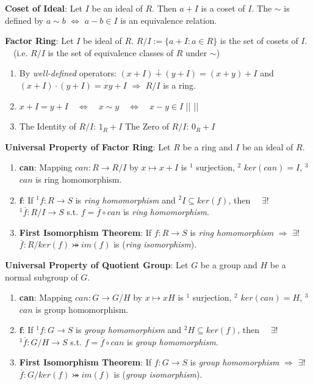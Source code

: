 \documentclass[9pt]{article}
\begin{document}
\textbf{Coset of Ideal}: Let $I$ be an ideal of $R$. Then $a+I$ is a coset of $I$. \quad The $\sim$ is defined by $a\sim b$ $\Leftrightarrow$ $a-b\in I$ is an equivalence relation.

\textbf{Factor Ring}: Let $I$ be ideal of $R$. $R/I:=\{a+I:a\in R\}$ is the set of cosets of $I$. \ \ {\small (i.e. $R/I$ is the set of equivalence classes of $R$ under $\sim$) }

\begin{enumerate}[itemsep=-2pt, topsep=-2pt]
    \item By \textit{well-defined} operators: $(x+I)\dotplus(y+I)=(x+y) + I$ and $(x+I)\cdot(y+I)=xy+I$ \quad $\Rightarrow$ \quad $R/I$ is a ring.
    \item $x+I=y+I \quad \Leftrightarrow \quad x\sim y \quad \Leftrightarrow \quad x-y\in I$ \qquad ||  \qquad || 
    \item The Identity of $R/I$: $1_R+I$ \quad The Zero of $R/I$: $0_R+I$
\end{enumerate}

\textbf{Universal Property of Factor Ring}: Let $R$ be a ring and $I$ be an ideal of $R$. 

\begin{enumerate}[itemsep=-2pt, topsep=-2pt]
    \item \textbf{can}: Mapping $can:R\to R/I$ by $x\mapsto x+I$ is $^1$ surjection, $^2$ $ker(can)=I$, $^3$ $can$ is ring homomorphism.
    \item \textbf{$\textbf{f}$}: If $^1f:R\to S$ is \textit{ring homomorphism} and $^2I\subseteq ker(f)$, then \ \ $\exists!$ $^1\overline{f}:R/I\to S$ s.t. $f=\overline{f}\circ can$ is \textit{ring homomorphism}.
    \item \textbf{First Isomorphism Theorem}: If $f:R\to S$ is \textit{ring homomorphism} $\Rightarrow$ $\exists!$ $\overline{f}:R/ker(f)\bij im(f)$ is  (\textit{ring isomorphism}).
\end{enumerate}

\textbf{Universal Property of Quotient Group}: Let $G$ be a group and $H$ be a normal subgroup of $G$. 
\begin{enumerate}[itemsep=-2pt, topsep=-2pt]
    \item \textbf{can}: Mapping $can:G\to G/H$ by $x\mapsto xH$ is $^1$ surjection, $^2$ $ker(can)=H$, $^3$ $can$ is group homomorphism.
    \item \textbf{$\textbf{f}$}: If $^1f:G\to S$ is \textit{group homomorphism} and $^2H\subseteq ker(f)$, then \ \ $\exists!$ $^1\overline{f}:G/H\to S$ s.t. $f=\overline{f}\circ can$ is \textit{group homomorphism}.
    \item \textbf{First Isomorphism Theorem}: If $f:G\to S$ is \textit{group homomorphism} $\Rightarrow$ $\exists!$ $\overline{f}:G/ker(f)\bij im(f)$ is  (\textit{group isomorphism}).
\end{enumerate}
\end{document}
